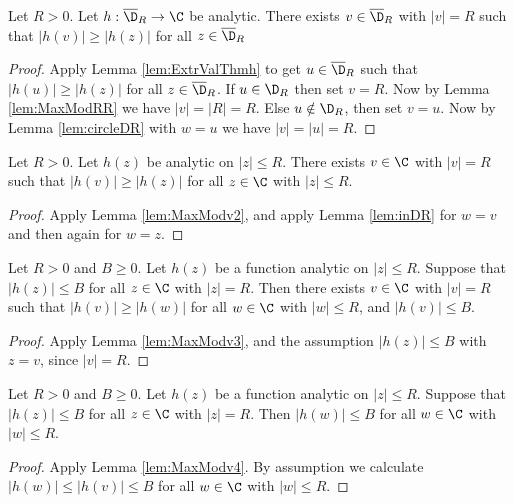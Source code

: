 \begin{lemma} \label{lem:MaxModv2}  \leanok
Let $R>0$. Let $h:\overline{\D}_R \to \C$ be analytic. There exists $v\in \overline{\D}_R$ with $|v|=R$ such that $|h(v)|\ge |h(z)|$ for all $z\in \overline{\D}_R$
\end{lemma}
\begin{proof} \leanok
{}
Apply Lemma \ref{lem:ExtrValThmh} to get $u\in \overline{\D}_R$ such that $|h(u)|\ge |h(z)|$ for all $z\in \overline{\D}_R$.
If $u\in \D_R$ then set $v=R$. Now by Lemma \ref{lem:MaxModRR} we have $|v|=|R|=R$.
Else $u\notin \D_R$, then set $v=u$. Now by Lemma \ref{lem:circleDR} with $w=u$ we have $|v|=|u|=R$.
\end{proof}

\begin{lemma} \label{lem:MaxModv3}  \leanok
Let $R>0$. Let $h(z)$ be analytic on $|z|\le R$. There exists $v\in \C$ with $|v|=R$ such that $|h(v)|\ge |h(z)|$ for all $z\in \C$ with $|z|\le R$.
\end{lemma}
\begin{proof} \leanok
{}
Apply Lemma \ref{lem:MaxModv2}, and apply Lemma \ref{lem:inDR} for $w=v$ and then again for $w=z$.
\end{proof}


\begin{lemma}\label{lem:MaxModv4}  \leanok
Let $R>0$ and $B\ge0$. Let $h(z)$ be a function analytic on $|z| \le R$. Suppose that $|h(z)| \le B$ for all $z\in \C$ with $|z|= R$. Then there exists $v\in \C$ with $|v|=R$ such that $|h(v)|\ge |h(w)|$ for all $w\in \C$ with $|w|\le R$, and $|h(v)| \le B$.
\end{lemma}
\begin{proof} \leanok
{}
Apply Lemma \ref{lem:MaxModv3}, and the assumption $|h(z)| \le B$ with $z=v$, since $|v|=R$.
\end{proof}

\begin{lemma} \label{lem:HardMMP}  \leanok
Let $R>0$ and $B\ge0$. Let $h(z)$ be a function analytic on $|z| \le R$. Suppose that $|h(z)| \le B$ for all $z\in \C$ with $|z|= R$. Then $|h(w)| \le B$ for all $w\in \C$ with $|w|\le R$.
\end{lemma}
\begin{proof} \leanok
{}
Apply Lemma \ref{lem:MaxModv4}. By assumption we calculate $|h(w)|\le |h(v)| \le B$ for all $w\in \C$ with $|w|\le R$.
\end{proof}

